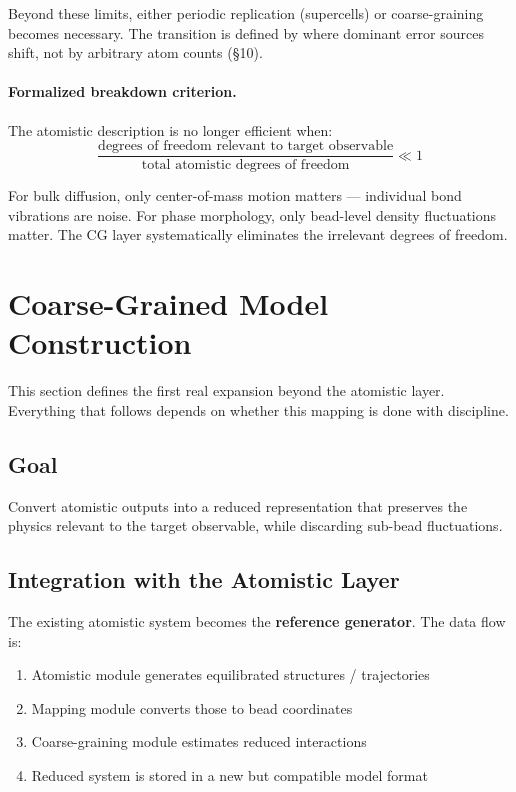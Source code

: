 \documentclass[11pt]{article}
\begin{document}
Beyond these limits, either periodic replication (supercells) or
coarse-graining becomes necessary.  The transition is defined by where
dominant error sources shift, not by arbitrary atom counts (\S10).

\paragraph{Formalized breakdown criterion.}
The atomistic description is no longer efficient when:
\begin{equation}
  \frac{\text{degrees of freedom relevant to target observable}}
       {\text{total atomistic degrees of freedom}} \ll 1
\end{equation}

For bulk diffusion, only center-of-mass motion matters --- individual
bond vibrations are noise.  For phase morphology, only bead-level density
fluctuations matter.  The CG layer systematically eliminates the
irrelevant degrees of freedom.

\section{Coarse-Grained Model Construction}
\label{sec:cg_model}

This section defines the first real expansion beyond the atomistic layer.
Everything that follows depends on whether this mapping is done with
discipline.

\subsection{Goal}

Convert atomistic outputs into a reduced representation that preserves the
physics relevant to the target observable, while discarding sub-bead
fluctuations.

\subsection{Integration with the Atomistic Layer}

The existing atomistic system becomes the \textbf{reference generator}.
The data flow is:

\begin{enumerate}
  \item Atomistic module generates equilibrated structures / trajectories
  \item Mapping module converts those to bead coordinates
  \item Coarse-graining module estimates reduced interactions
  \item Reduced system is stored in a new but compatible model format
\end{enumerate}
\end{document}
